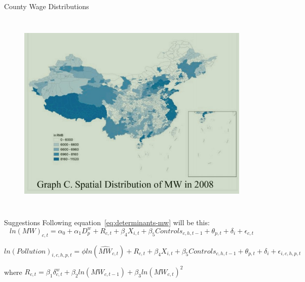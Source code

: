 \documentclass[aspectratio = 169]{beamer}
\begin{document}
\begin{frame}{County Wage Distributions}
\begin{columns}
            \begin{figure}
                \centering
                \includegraphics[width = \textwidth, height = 0.5\textheight]{climate_change/beamer/wd2008}
                \label{fig:chinese-mw2008}
            \end{figure}
        \end{columns}
    \end{frame}

    \begin{frame}{Suggestions}
        Following equation~\ref{eq:determinants-mw} will be this:
        \begin{equation}
            ln(MW)_{c,t} = \alpha_0 + \alpha_{1}D_{p}^{w} + R_{c,t} + \beta_{4}X_{i,t} + \beta_{5}Controls_{c,h,t-1} + \theta_{p,t} + \delta_{i} + \epsilon_{c,t}\label{eq:first-stage-mw}
        \end{equation}

        \begin{equation}
            ln(Pollution)_{i,c,h,p,t} = \phi ln(\hat{MW}_{c,t}) + R_{c,t} + \beta_{4}X_{i,t} + \beta_{5}Controls_{c,h,t-1} + \theta_{p,t} + \delta_{i} + \epsilon_{i,c,h,p,t}\label{eq:second-stage-mw}
        \end{equation}

        where $R_{c,t} = \beta_{1}\delta_{c,t}^{w} + \beta_{2}ln(MW_{c,t-1}) + \beta_{3}ln(MW_{c,t})^2$
    \end{frame}
\end{document}
